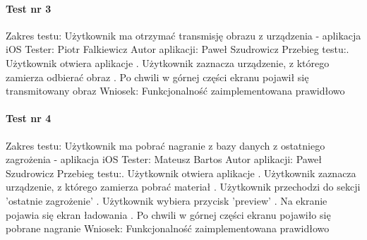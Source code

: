  \paragraph{Test nr 3}
Zakres testu:\newline
Użytkownik ma otrzymać transmisję obrazu z urządzenia - aplikacja iOS\newline
Tester: Piotr Falkiewicz \newline
Autor aplikacji: Paweł Szudrowicz \newline
Przebieg testu:. Użytkownik otwiera aplikacje . Użytkownik zaznacza urządzenie, z którego zamierza odbierać obraz . Po chwili w górnej części ekranu pojawił się transmitowany obraz\newline
Wniosek:\newline
Funkcjonalność zaimplementowana prawidłowo\newline
\newline

 \paragraph{Test nr 4}
Zakres testu:\newline
Użytkownik ma pobrać nagranie z bazy danych z ostatniego zagrożenia - aplikacja iOS\newline
Tester: Mateusz Bartos \newline
Autor aplikacji: Paweł Szudrowicz \newline
Przebieg testu:. Użytkownik otwiera aplikacje . Użytkownik zaznacza urządzenie, z którego zamierza pobrać materiał . Użytkownik przechodzi do sekcji 'ostatnie zagrożenie' . Użytkownik wybiera przycisk 'preview' . Na ekranie pojawia się ekran ładowania . Po chwili w górnej części ekranu pojawiło się pobrane nagranie \newline
Wniosek:\newline
Funkcjonalność zaimplementowana prawidłowo\newline

